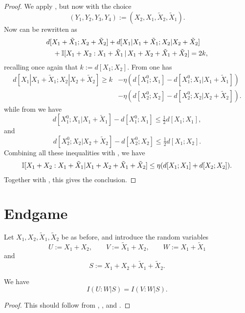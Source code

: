 \begin{proof}
  \leanok
  We apply , but now with the choice
  \[
    (Y_1,Y_2,Y_3,Y_4) := (X_2, X_1, \tilde X_2, \tilde X_1).
  \]
  Now  can be rewritten as
  \begin{align*}
    &d[X_1+\tilde X_1;X_2+\tilde X_2] + d[X_1|X_1+\tilde X_1; X_2|X_2+\tilde X_2] \\
    &\quad + \mathbb{I}[X_1+X_2 : X_1 + \tilde X_1 \,|\, X_1+X_2+\tilde X_1+\tilde X_2] = 2k,
  \end{align*}
  recalling once again that $k := d[X_1;X_2]$.  From  one has
  \begin{align*}
    d[X_1|X_1+\tilde X_1; X_2|X_2+\tilde X_2]   \geq k &- \eta (d[X^0_1;X_1] - d[X^0_1;X_1|X_1+\tilde X_1]) \\& - \eta (d[X^0_2;X_2] - d[X^0_2;X_2|X_2+\tilde X_2]) .
  \end{align*}
  while from  we have
  \[
    d[X^0_1;X_1|X_1+\tilde X_1] -  d[X^0_1;X_1] \leq  \tfrac{1}{2} d[X_1;X_1],
  \]
  and
  \[
    d[X^0_2;X_2|X_2+\tilde X_2] -  d[X^0_2;X_2] \leq \tfrac{1}{2} d[X_1;X_2].
    \]
  Combining all these inequalities with , we have
  \begin{equation}\label{combined}
  \mathbb{I}[X_1+X_2 : X_1 + \tilde X_1 | X_1+X_2+\tilde X_1+\tilde X_2] \leq \eta ( d[X_1; X_1] + d[X_2; X_2] ).
  \end{equation}
  Together with , this gives the conclusion.
\end{proof}


\section{Endgame}

Let $X_1,X_2,\tilde X_1,\tilde X_2$ be as before, and introduce the random variables
\[U := X_1 + X_2, \qquad V := \tilde X_1 + X_2, \qquad W := X_1 + \tilde X_1\] and
\[  S := X_1 + X_2 + \tilde X_1 + \tilde X_2.\]

\begin{lemma}\label{symm-lemma}
  \leanok
We have
$$ I(U:W | S) = I(V:W | S).$$
\end{lemma}

\begin{proof}\leanok
This should follow from , , and .
\end{proof}

